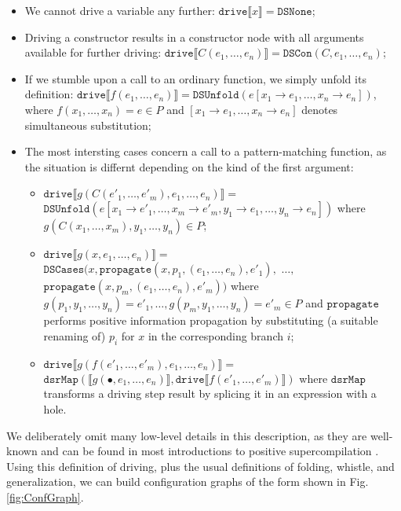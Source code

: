 \documentclass[submission,copyright,creativecommons]{eptcs}
\begin{document}
\begin{itemize}
  \item We cannot drive a variable any further: $\mathtt{drive} \llbracket x \rrbracket = \mathtt{DSNone}$;
  \item Driving a constructor results in a constructor node with all arguments available for
    further driving: $\mathtt{drive} \llbracket C(e_1, \ldots, e_n) \rrbracket = \mathtt{DSCon}(C, e_1, \ldots, e_n)$;
  \item If we stumble upon a call to an ordinary function, we simply unfold its definition:
    $\mathtt{drive} \llbracket f(e_1, \ldots, e_n) \rrbracket = \mathtt{DSUnfold}(e [ x_1\rightarrow e_1, \ldots, x_n\rightarrow e_n ])$,
    where $f(x_1, \ldots, x_n) = e \in P$ and $ [ x_1\rightarrow e_1, \ldots, x_n\rightarrow e_n ] $
    denotes simultaneous substitution;
  \item The most intersting cases concern a call to a pattern-matching function, as the situation is
    differnt depending on the kind of the first argument:
    \begin{itemize}
      \item $\mathtt{drive} \llbracket g(C(e'_1, \ldots, e'_m), e_1, \ldots, e_n) \rrbracket =$
        $\mathtt{DSUnfold}(e [ x_1\rightarrow e'_1, \ldots, x_m\rightarrow e'_m, y_1 \rightarrow e_1, \ldots, y_n \rightarrow e_n ])$
        where $g(C(x_1, \ldots, x_m), y_1, \ldots, y_n) \in P$;
      \item $\mathtt{drive} \llbracket g(x, e_1, \ldots, e_n) \rrbracket =$
        $\mathtt{DSCases}(x, \mathtt{propagate}(x, p_1, (e_1, \ldots, e_n), e'_1),$ $\ldots,$ \\
          $\mathtt{propagate}(x, p_m, (e_1, \ldots, e_n), e'_m))$
        where $g(p_1, y_1, \ldots, y_n) = e'_1, \ldots, g(p_m, y_1, \ldots, y_n) = e'_m \in P$
        and $\mathtt{propagate}$ performs positive information propagation by substituting (a suitable renaming of) $p_i$ for $x$ 
        in the corresponding branch $i$;
      \item $\mathtt{drive} \llbracket g(f(e'_1, \ldots, e'_m), e_1, \ldots, e_n) \rrbracket =$
        $\mathtt{dsrMap}(\llbracket g(\bullet, e_1, \ldots, e_n) \rrbracket, \mathtt{drive} \llbracket f(e'_1, \ldots, e'_m) \rrbracket)$
        where $\mathtt{dsrMap}$ transforms a driving step result by splicing it in an expression with a hole.
    \end{itemize}
\end{itemize}
We deliberately omit many low-level details in this description, as they are well-known and can be found
in most introductions to positive supercompilation \cite{Sorensen1994TurchinSupercompiler,sorm98b,TMR/SCP2014}.
Using this definition of driving, plus the usual definitions of folding, whistle, and generalization, 
we can build configuration graphs of the form shown in Fig. \ref{fig:ConfGraph}.
\end{document}
